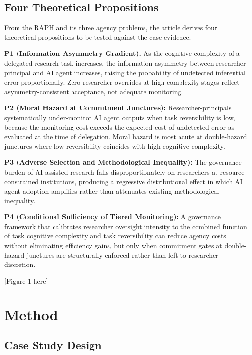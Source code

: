 \documentclass[12pt]{article}
\begin{document}
\subsection{Four Theoretical Propositions}

From the RAPH and its three agency problems, the article derives four theoretical propositions to be
tested against the case evidence.

\textbf{P1 (Information Asymmetry Gradient):} As the cognitive complexity of a delegated
research task increases, the information asymmetry between researcher-principal and AI agent
increases, raising the probability of undetected inferential error proportionally. Zero
researcher overrides at high-complexity stages reflect asymmetry-consistent acceptance, not
adequate monitoring.

\textbf{P2 (Moral Hazard at Commitment Junctures):} Researcher-principals systematically
under-monitor AI agent outputs when task reversibility is low, because the monitoring cost
exceeds the expected cost of undetected error as evaluated at the time of delegation. Moral
hazard is most acute at double-hazard junctures where low reversibility coincides with
high cognitive complexity.

\textbf{P3 (Adverse Selection and Methodological Inequality):} The governance burden of
AI-assisted research falls disproportionately on researchers at resource-constrained
institutions, producing a regressive distributional effect in which AI agent adoption
amplifies rather than attenuates existing methodological inequality.

\textbf{P4 (Conditional Sufficiency of Tiered Monitoring):} A governance framework that
calibrates researcher oversight intensity to the combined function of task cognitive complexity
and task reversibility can reduce agency costs without eliminating efficiency gains, but
only when commitment gates at double-hazard junctures are structurally enforced rather than
left to researcher discretion.

\bigskip

[Figure 1 here]

\bigskip

\section{Method}

\subsection{Case Study Design}
\end{document}
